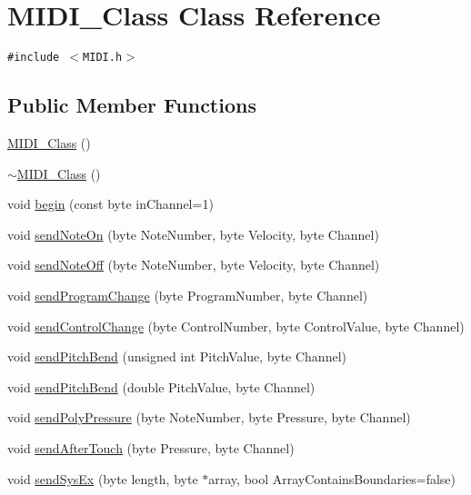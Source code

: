 \hypertarget{class_m_i_d_i___class}{
\section{MIDI\_\-Class Class Reference}
\label{class_m_i_d_i___class}
}
{\tt \#include $<$MIDI.h$>$}

\subsection*{Public Member Functions}
\begin{CompactItemize}
\item 
\hyperlink{class_m_i_d_i___class_5e395e8f748ec53a0818bffd0e2f176f}{MIDI\_\-Class} ()
\item 
\hyperlink{class_m_i_d_i___class_cea4c4db7092ba5cb7c147a3fb215e07}{$\sim$MIDI\_\-Class} ()
\item 
void \hyperlink{class_m_i_d_i___class_c34d163205bb01ac5e03df7e64facebe}{begin} (const byte inChannel=1)
\item 
void \hyperlink{class_m_i_d_i___class_9664e523b35d8b42749e7bc3ba888943}{sendNoteOn} (byte NoteNumber, byte Velocity, byte Channel)
\item 
void \hyperlink{class_m_i_d_i___class_381e1e8019aae5f872279cda496f964c}{sendNoteOff} (byte NoteNumber, byte Velocity, byte Channel)
\item 
void \hyperlink{class_m_i_d_i___class_803c2652837c09775d115354672bf69d}{sendProgramChange} (byte ProgramNumber, byte Channel)
\item 
void \hyperlink{class_m_i_d_i___class_3a80e9bd2cfdb619be91d80e8f3b7825}{sendControlChange} (byte ControlNumber, byte ControlValue, byte Channel)
\item 
void \hyperlink{class_m_i_d_i___class_45dcd73e3b8a107334e687750514f8b5}{sendPitchBend} (unsigned int PitchValue, byte Channel)
\item 
void \hyperlink{class_m_i_d_i___class_16800e955a1d0d66e6bda6727588b1eb}{sendPitchBend} (double PitchValue, byte Channel)
\item 
void \hyperlink{class_m_i_d_i___class_028ec5a49dccf9c28b00e11e7a3d1d05}{sendPolyPressure} (byte NoteNumber, byte Pressure, byte Channel)
\item 
void \hyperlink{class_m_i_d_i___class_73b57f656a80166b98dc1b57ea9a56dc}{sendAfterTouch} (byte Pressure, byte Channel)
\item 
void \hyperlink{class_m_i_d_i___class_73a36cacf4e77ca081979f9c7066ee28}{sendSysEx} (byte length, byte $\ast$array, bool ArrayContainsBoundaries=false)

\end{CompactItemize}
